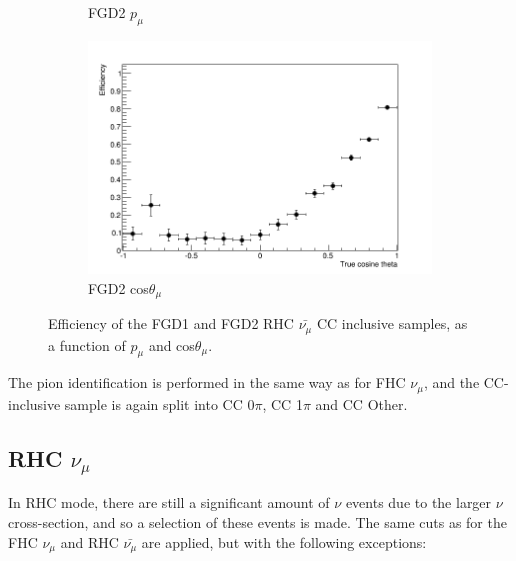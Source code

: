 \begin{figure}[t]
\begin{subfigure}{.48\textwidth}
  \caption{FGD2 $p_{\mu}$}
\end{subfigure}
\begin{subfigure}{.48\textwidth}
  \centering
  \includegraphics[width=0.95\linewidth]{figs/effcosfgd2numubar}
  \caption{FGD2 cos$\theta_{\mu}$}
\end{subfigure}
\caption{Efficiency of the FGD1 and FGD2 RHC $\bar{\nu_{\mu}}$ CC inclusive samples, as a function of $p_{\mu}$ and cos$\theta_{\mu}$.}
\label{fig:numubareff}
\end{figure}

The pion identification is performed in the same way as for FHC $\nu_{\mu}$, and the CC-inclusive sample is again split into CC 0$\pi$, CC 1$\pi$ and CC Other.

\subsection{RHC $\nu_{\mu}$}

In RHC mode, there are still a significant amount of $\nu$ events due to the larger $\nu$ cross-section, and so a selection of these events is made. The same cuts as for the FHC $\nu_{\mu}$ and RHC $\bar{\nu_{\mu}}$ are applied, but with the following exceptions:

